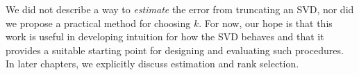 We did not describe a way to \emph{estimate} the error from truncating an SVD,
nor did we propose a practical method for choosing $k$. For now, our hope is
that this work is useful in developing intuition for how the SVD behaves and
that it provides a suitable starting point for designing and evaluating such
procedures. In later chapters, we explicitly discuss estimation and rank
selection.
